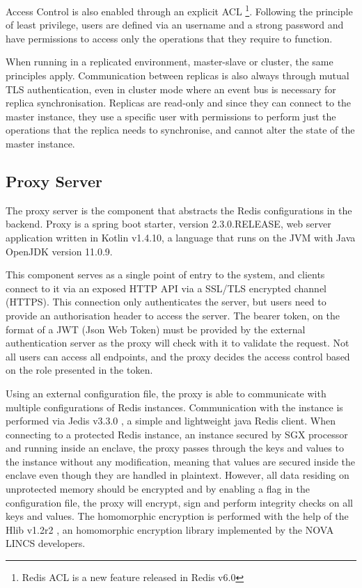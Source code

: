 Access Control is also enabled through an explicit \gls{ACL} \footnote{Redis ACL is a new feature released in Redis v6.0}. Following the principle of least privilege, users are defined via an username and a strong password and have permissions to access only the operations that they require to function.

When running in a replicated environment, master-slave or cluster, the same principles apply. Communication between replicas is also always through mutual \gls{TLS} authentication, even in cluster mode where an event bus is necessary for replica synchronisation. Replicas are read-only and since they can connect to the master instance, they use a specific user with permissions to perform just the operations that the replica needs to synchronise, and cannot alter the state of the master instance.

\subsection{Proxy Server}
\label{ssec:proxy_server}

The proxy server is the component that abstracts the Redis configurations in the backend. Proxy is a spring boot starter, version 2.3.0.RELEASE, web server application written in Kotlin v1.4.10, a language that runs on the \gls{JVM} with Java OpenJDK version 11.0.9.

This component serves as a single point of entry to the system, and clients connect to it via an exposed \gls{HTTP} \gls{API} via a \gls{SSL}/\gls{TLS} encrypted channel (\gls{HTTPS}). This connection only authenticates the server, but users need to provide an authorisation header to access the server. The bearer token, on the format of a \gls{JWT} (Json Web Token) must be provided by the external authentication server as the proxy will check with it to validate the request. Not all users can access all endpoints, and the proxy decides the access control based on the role presented in the token.

Using an external configuration file, the proxy is able to communicate with multiple configurations of Redis instances. Communication with the instance is performed via Jedis v3.3.0 \cite{jedis:1}, a simple and lightweight java Redis client. When connecting to a protected Redis instance, an instance secured by \gls{SGX} processor and running inside an enclave, the proxy passes through the keys and values to the instance without any modification, meaning that values are secured inside the enclave even though they are handled in plaintext. However, all data residing on unprotected memory should be encrypted and by enabling a flag in the configuration file, the proxy will encrypt, sign and perform integrity checks on all keys and values. The homomorphic encryption is performed with the help of the Hlib v1.2r2 \cite{homolib:1}, an homomorphic encryption library implemented by the NOVA LINCS developers.

